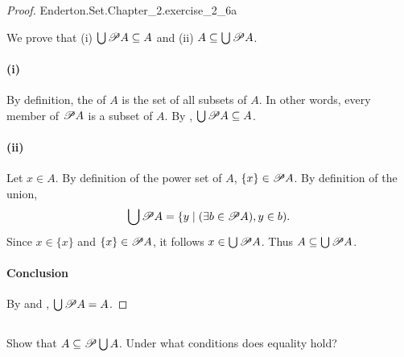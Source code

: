 \documentclass{report}
\begin{document}
\begin{proof}

    {Enderton.Set.Chapter\_2.exercise\_2\_6a}

  We prove that (i) $\bigcup \mathscr{P}A \subseteq A$ and (ii)
    $A \subseteq \bigcup \mathscr{P}A$.

  \paragraph{(i)}%
  \label{par:exercise-2.6a-i}

    By definition, the  of $A$ is the set of all subsets
      of $A$.
    In other words, every member of $\mathscr{P}A$ is a subset of $A$.
    By , $\bigcup \mathscr{P}A \subseteq A$.

  \paragraph{(ii)}%
  \label{par:exercise-2.6a-ii}

    Let $x \in A$.
    By definition of the power set of $A$, $\{x\} \in \mathscr{P}A$. 
    By definition of the union,
      $$\bigcup \mathscr{P}A =
        \{ y \mid (\exists b \in \mathscr{P}A), y \in b).$$
    Since $x \in \{x\}$ and $\{x\} \in \mathscr{P}A$, it follows
      $x \in \bigcup \mathscr{P}A$.
    Thus $A \subseteq \bigcup \mathscr{P}A$.

  \paragraph{Conclusion}%

    By  and ,
      $\bigcup \mathscr{P}A = A$.

\end{proof}

\subsection{}%
\label{sub:exercise-2.6b}

Show that $A \subseteq \mathscr{P}\bigcup A$.
Under what conditions does equality hold?
\end{document}
